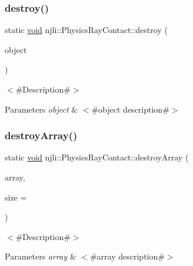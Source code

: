 \subsubsection{\texorpdfstring{destroy()}{destroy()}}
{\footnotesize\ttfamily static \mbox{\hyperlink{_thread_8h_af1e856da2e658414cb2456cb6f7ebc66}{void}} njli\+::\+Physics\+Ray\+Contact\+::destroy (\begin{DoxyParamCaption}\item[{\mbox{\hyperlink{classnjli_1_1_physics_ray_contact}{Physics\+Ray\+Contact}} $\ast$}]{object }\end{DoxyParamCaption})\hspace{0.3cm}{\ttfamily [static]}}

$<$\#\+Description\#$>$


\begin{DoxyParams}{Parameters}
{\em object} & $<$\#object description\#$>$ \\
\hline
\end{DoxyParams}
\mbox{\label{classnjli_1_1_physics_ray_contact_a83407a542ac6b4fe3afb856949a6c8f1}} 
\subsubsection{\texorpdfstring{destroy\+Array()}{destroyArray()}}
{\footnotesize\ttfamily static \mbox{\hyperlink{_thread_8h_af1e856da2e658414cb2456cb6f7ebc66}{void}} njli\+::\+Physics\+Ray\+Contact\+::destroy\+Array (\begin{DoxyParamCaption}\item[{\mbox{\hyperlink{classnjli_1_1_physics_ray_contact}{Physics\+Ray\+Contact}} $\ast$$\ast$}]{array,  }\item[{const \mbox{\hyperlink{_util_8h_a10e94b422ef0c20dcdec20d31a1f5049}{u32}}}]{size = {} }\end{DoxyParamCaption})\hspace{0.3cm}{\ttfamily [static]}}

$<$\#\+Description\#$>$


\begin{DoxyParams}{Parameters}
{\em array} & $<$\#array description\#$>$ \\
\hline
\end{DoxyParams}
\mbox{\label{classnjli_1_1_physics_ray_contact_a0359afcb01f851ad9774bda869bc8eea}} 
